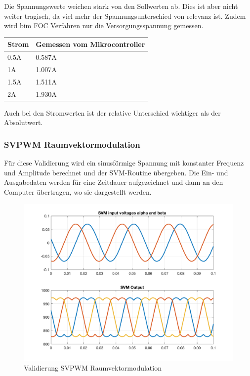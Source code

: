 Die Spannungswerte weichen stark von den Sollwerten ab. Dies ist aber nicht weiter tragisch, da viel mehr der Spannungsunterschied von relevanz ist. Zudem wird bim FOC Verfahren nur die Versorgungsspannung gemessen.

\begin{center}
	\begin{tabular}{l|l}
		Strom & Gemessen vom Mikrocontroller \\ \hline
		0.5A & 0.587A\\ \hline
		1A & 1.007A\\ \hline
		1.5A & 1.511A\\ \hline
		2A & 1.930A\\ \hline
	\end{tabular} 
	\label{tab:stromsw}
\end{center}

Auch bei den Stromwerten ist der relative Unterschied wichtiger als der Absolutwert.

\subsubsection*{SVPWM Raumvektormodulation}
Für diese Validierung wird ein sinusförmige Spannung mit konstanter Frequenz und Amplitude berechnet und der SVM-Routine übergeben. Die Ein- und Ausgabedaten werden für eine Zeitdauer aufgezeichnet und dann an den Computer übertragen, wo sie dargestellt werden.

\begin{figure} [H]
	\centering
	\includegraphics[width=0.8\linewidth]{images/valmcsvm.png}
	\caption{Validierung SVPWM Raumvektormodulation}
	\label{fig:svpwm}
\end{figure}


